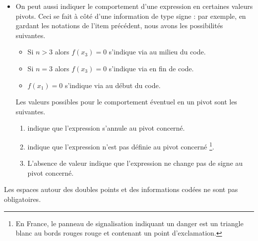 \documentclass[10pt, a4paper]{article}
\begin{document}
\begin{enumerate}
\begin{itemize}
        \item On peut aussi indiquer le comportement d'une expression en certaines valeurs pivots. Ceci se fait à côté d'une information de type signe : par exemple, en gardant les notations de l'item précédent, nous avons les possibilités suivantes.
        \begin{itemize}
            \item Si $n > 3$ alors $f(x_3) = 0$ s'indique via  au milieu du code.

            \item Si $n = 3$ alors $f(x_3) = 0$ s'indique via  en fin de code.

            \item $f(x_1) = 0$ s'indique via     au début du code.
        \end{itemize}
        Les valeurs possibles pour le comportement éventuel en un pivot sont les suivantes.
        \begin{enumerate}
            \item {} indique que
l'expression s'annule au pivot concerné.

            \item \tdoclatexin{!} indique que
l'expression n'est pas définie au pivot concerné
            \footnote{
                En France, le panneau de signalisation indiquant un danger est un triangle blanc au bords rouges rouge et contenant un point d'exclamation.
            }.

            \item L'absence de valeur indique que l'expression ne change pas de signe au pivot concerné.
        \end{enumerate}
    \end{itemize}
\end{enumerate}








\begin{tdocnote}
    Les espaces autour des doubles points et des informations codées ne sont pas obligatoires.
\end{tdocnote}


\end{document}
